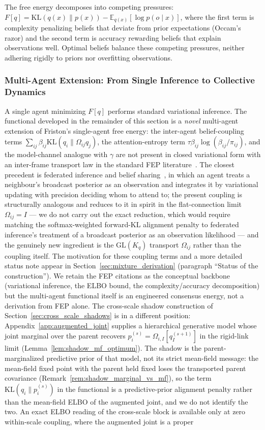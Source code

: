 \documentclass[11pt]{article}
\begin{document}
The free energy decomposes into competing pressures: $F[q] = \mathrm{KL}(q(x) \| p(x)) - \mathbb{E}_{q(x)}[\log p(o \mid x)]$, where the first term is complexity penalizing beliefs that deviate from prior expectations (Occam's razor) and the second term is accuracy rewarding beliefs that explain observations well. Optimal beliefs balance these competing pressures, neither adhering rigidly to priors nor overfitting observations.

\subsubsection{Multi-Agent Extension: From Single Inference to Collective Dynamics}

A single agent minimizing $F[q]$ performs standard variational inference. The functional developed in the remainder of this section is a \emph{novel} multi-agent extension of Friston's single-agent free energy: the inter-agent belief-coupling terms $\sum_{ij}\beta_{ij}\mathrm{KL}(q_i\|\Omega_{ij}q_j)$, the attention-entropy term $\tau\beta_{ij}\log(\beta_{ij}/\pi_{ij})$, and the model-channel analogue with $\gamma$ are not present in closed variational form with an inter-frame transport law in the standard FEP literature~\cite{Friston2010, parr2022active}. The closest precedent is federated inference and belief sharing~\cite{friston2024federated}, in which an agent treats a neighbour's broadcast posterior as an observation and integrates it by variational updating with precision deciding whom to attend to; the present coupling is structurally analogous and reduces to it in spirit in the flat-connection limit $\Omega_{ij} = I$ — we do not carry out the exact reduction, which would require matching the softmax-weighted forward-KL alignment penalty to federated inference's treatment of a broadcast posterior as an observation likelihood — and the genuinely new ingredient is the $\mathrm{GL}(K_q)$ transport $\Omega_{ij}$ rather than the coupling itself. The motivation for these coupling terms and a more detailed status note appear in Section~\ref{sec:mixture_derivation} (paragraph ``Status of the construction''). We retain the FEP citations as the conceptual backbone (variational inference, the ELBO bound, the complexity/accuracy decomposition) but the multi-agent functional itself is an engineered consensus energy, not a derivation from FEP alone. The cross-scale shadow construction of Section~\ref{sec:cross_scale_shadows} is in a different position: Appendix~\ref{app:augmented_joint} supplies a hierarchical generative model whose joint marginal over the parent recovers $p_i^{(s)} = \Omega_{i,I}[q_I^{(s+1)}]$ in the rigid-link limit (Lemma~\ref{lem:shadow_mf_optimum}). The shadow is the parent-marginalized predictive prior of that model, not its strict mean-field message: the mean-field fixed point with the parent held fixed loses the transported parent covariance (Remark~\ref{rem:shadow_marginal_vs_mf}), so the term $\mathrm{KL}(q_i \| p_i^{(s)})$ in the functional is a predictive-prior alignment penalty rather than the mean-field ELBO of the augmented joint, and we do not identify the two. An exact ELBO reading of the cross-scale block is available only at zero within-scale coupling, where the augmented joint is a proper 
\end{document}
